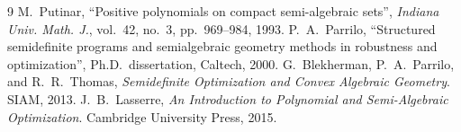 \documentclass[11pt]{article}
\begin{document}
\begin{thebibliography}{9}
 M.~Putinar, ``Positive polynomials on compact
  semi-algebraic sets'', \emph{Indiana Univ. Math. J.}, vol.~42, no.~3,
  pp.~969--984, 1993.
 P.~A.~Parrilo, ``Structured semidefinite programs
  and semialgebraic geometry methods in robustness and optimization'',
  Ph.D.~dissertation, Caltech, 2000.
 G.~Blekherman, P.~A.~Parrilo, and R.~R.~Thomas,
  \emph{Semidefinite Optimization and Convex Algebraic Geometry}.
  SIAM, 2013.
 J.~B.~Lasserre, \emph{An Introduction to Polynomial
  and Semi-Algebraic Optimization}. Cambridge University Press, 2015.
\end{thebibliography}
\end{document}
